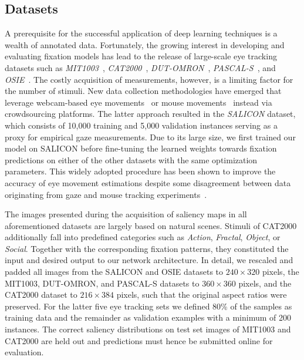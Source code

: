 \documentclass[final,1p,times,number]{elsarticle}
\begin{document}
\subsection{Datasets}

A prerequisite for the successful application of deep learning techniques is a wealth of annotated data. Fortunately, the growing interest in developing and evaluating fixation models has lead to the release of large-scale eye tracking datasets such as \textit{MIT1003}~\cite{judd2009learning}, \textit{CAT2000}~\cite{borji2015cat2000}, \textit{DUT-OMRON}~\cite{yang2013saliency}, \textit{PASCAL-S}~\cite{li2014secrets}, and \textit{OSIE}~\cite{xu2014predicting}. The costly acquisition of measurements, however, is a limiting factor for the number of stimuli. New data collection methodologies have emerged that leverage webcam-based eye movements~\cite{xu2015turkergaze} or mouse movements~\cite{jiang2015salicon} instead via crowdsourcing platforms. The latter approach resulted in the \textit{SALICON} dataset, which consists of 10,000 training and 5,000 validation instances serving as a proxy for empirical gaze measurements. Due to its large size, we first trained our model on SALICON before fine-tuning the learned weights towards fixation predictions on either of the other datasets with the same optimization parameters. This widely adopted procedure has been shown to improve the accuracy of eye movement estimations despite some disagreement between data originating from gaze and mouse tracking experiments~\cite{tavakoli2017saliency}.

The images presented during the acquisition of saliency maps in all aforementioned datasets are largely based on natural scenes. Stimuli of CAT2000 additionally fall into predefined categories such as \textit{Action}, \textit{Fractal}, \textit{Object}, or \textit{Social}. Together with the corresponding fixation patterns, they constituted the input and desired output to our network architecture. In detail, we rescaled and padded all images from the SALICON and OSIE datasets to $240\times320$ pixels, the MIT1003, DUT-OMRON, and PASCAL-S datasets to $360\times360$ pixels, and the CAT2000 dataset to $216\times384$ pixels, such that the original aspect ratios were preserved. For the latter five eye tracking sets we defined 80\% of the samples as training data and the remainder as validation examples with a minimum of 200 instances. The correct saliency distributions on test set images of MIT1003 and CAT2000 are held out and predictions must hence be submitted online for evaluation.
\end{document}
